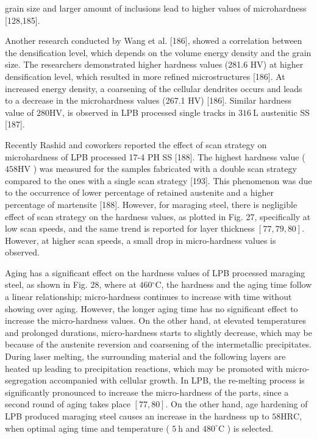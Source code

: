 \documentclass[10pt]{article}
\begin{document}
grain size and larger amount of inclusions lead to higher values of microhardness [128,185].

Another research conducted by Wang et al. [186], showed a correlation between the densification level, which depends on the volume energy density and the grain size. The researchers demonstrated higher hardness values (281.6 HV) at higher densification level, which resulted in more refined microstructures [186]. At increased energy density, a coarsening of the cellular dendrites occurs and leads to a decrease in the microhardness values (267.1 HV) [186]. Similar hardness value of $280 \mathrm{HV}$, is observed in LPB processed single tracks in $316 \mathrm{~L}$ austenitic SS [187].

Recently Rashid and coworkers reported the effect of scan strategy on microhardness of LPB processed 17-4 PH SS [188]. The highest hardness value ( $458 \mathrm{HV}$ ) was measured for the samples fabricated with a double scan strategy compared to the ones with a single scan strategy [193]. This phenomenon was due to the occurrence of lower percentage of retained austenite and a higher percentage of martensite [188]. However, for maraging steel, there is negligible effect of scan strategy on the hardness values, as plotted in Fig. 27, specifically at low scan speeds, and the same trend is reported for layer thickness $[77,79,80]$. However, at higher scan speeds, a small drop in micro-hardness values is observed.

Aging has a significant effect on the hardness values of LPB processed maraging steel, as shown in Fig. 28, where at $460{ }^{\circ} \mathrm{C}$, the hardness and the aging time follow a linear relationship; micro-hardness continues to increase with time without showing over aging. However, the longer aging time has no significant effect to increase the micro-hardness values. On the other hand, at elevated temperatures and prolonged durations, micro-hardness starts to slightly decrease, which may be because of the austenite reversion and coarsening of the intermetallic precipitates. During laser melting, the surrounding material and the following layers are heated up leading to precipitation reactions, which may be promoted with micro-segregation accompanied with cellular growth. In LPB, the re-melting process is significantly pronounced to increase the micro-hardness of the parts, since a second round of aging takes place $[77,80]$. On the other hand, age hardening of LPB produced maraging steel causes an increase in the hardness up to $58 \mathrm{HRC}$, when optimal aging time and temperature ( $5 \mathrm{~h}$ and $480^{\circ} \mathrm{C}$ ) is selected.
\end{document}
